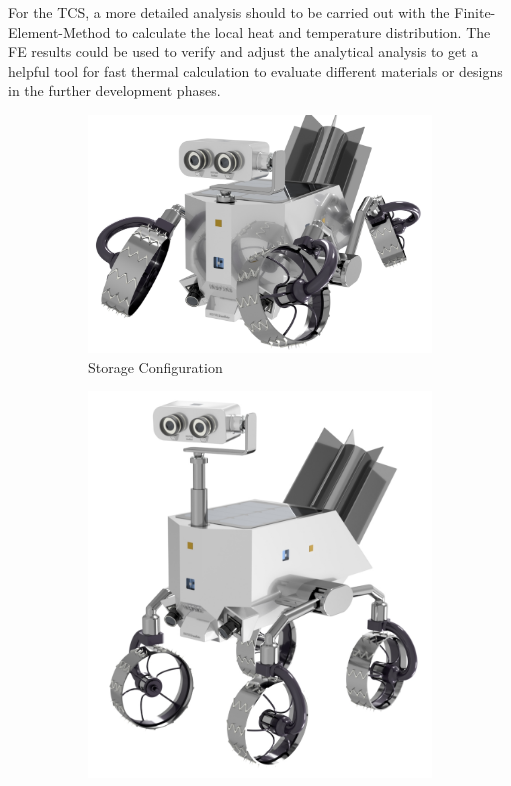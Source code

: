For the TCS, a more detailed analysis should to be carried out with the Finite-Element-Method to calculate the local heat and temperature distribution.
The FE results could be used to verify and adjust the analytical analysis to get a helpful tool for fast thermal calculation to evaluate different materials or designs in the further development phases.

\begin{figure}[htb]
     \centering
     \begin{subfigure}[b]{0.49\textwidth}
         \centering
         \includegraphics[width=\textwidth]{Media/INSPIRE Mk6_HighRes_Stowage_config}
         \caption{Storage Configuration}
         \label{fig:EndStorageConfig}
     \end{subfigure}
     \hfill
     \begin{subfigure}[b]{0.49\textwidth}
         \centering
         \includegraphics[width=\textwidth]{Media/INSPIRE Mk6_HighRes_Exploration}

\end{subfigure}
\end{figure}

